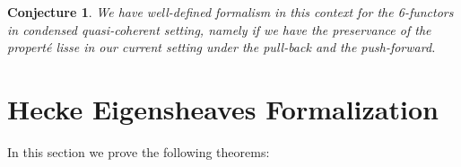 \documentclass[12pt]{book}
\newtheorem{conjecture}{Conjecture}
\theoremstyle{definition}
\begin{document}
\begin{conjecture}
We have well-defined formalism in this context for the 6-functors in condensed quasi-coherent setting, namely if we have the preservance of the \textit{propert\'e lisse} in our current setting under the pull-back and the push-forward.
\end{conjecture}







\newpage
\section{Hecke Eigensheaves Formalization}

\noindent In this section we prove the following theorems:
\end{document}
